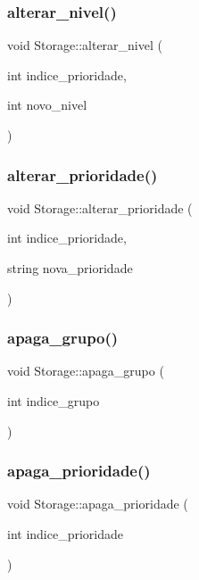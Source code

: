 \subsubsection{\texorpdfstring{alterar\+\_\+nivel()}{alterar\_nivel()}}
{\footnotesize\ttfamily void Storage\+::alterar\+\_\+nivel (\begin{DoxyParamCaption}\item[{int}]{indice\+\_\+prioridade,  }\item[{int}]{novo\+\_\+nivel }\end{DoxyParamCaption})}

\mbox{\label{classStorage_aad0905f797b2112aa95846bbb1714873}} 
\subsubsection{\texorpdfstring{alterar\+\_\+prioridade()}{alterar\_prioridade()}}
{\footnotesize\ttfamily void Storage\+::alterar\+\_\+prioridade (\begin{DoxyParamCaption}\item[{int}]{indice\+\_\+prioridade,  }\item[{string}]{nova\+\_\+prioridade }\end{DoxyParamCaption})}

\mbox{\label{classStorage_abf9179dcd9d27a8e1b5faf74d254f1bb}} 
\subsubsection{\texorpdfstring{apaga\+\_\+grupo()}{apaga\_grupo()}}
{\footnotesize\ttfamily void Storage\+::apaga\+\_\+grupo (\begin{DoxyParamCaption}\item[{int}]{indice\+\_\+grupo }\end{DoxyParamCaption})}

\mbox{\label{classStorage_ac05b88b868646f514f2c8c114c28ce60}} 
\subsubsection{\texorpdfstring{apaga\+\_\+prioridade()}{apaga\_prioridade()}}
{\footnotesize\ttfamily void Storage\+::apaga\+\_\+prioridade (\begin{DoxyParamCaption}\item[{int}]{indice\+\_\+prioridade }\end{DoxyParamCaption})}

